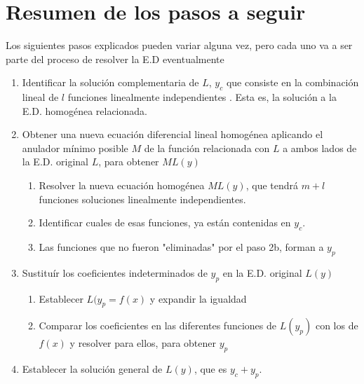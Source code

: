 \documentclass{article}
\theoremstyle{definition}
\begin{document}
\section{Resumen de los pasos a seguir}

Los siguientes pasos explicados pueden variar alguna vez, pero cada uno va a ser parte del proceso de resolver la E.D eventualmente

\begin{enumerate}
\item Identificar la soluci\'{o}n complementaria de $L$, $y_c$ que consiste en la combinaci\'{o}n lineal de $l$ funciones linealmente independientes . Esta es, la soluci\'{o}n a la E.D. homog\'{e}nea relacionada.

\item Obtener una nueva ecuaci\'{o}n diferencial lineal homog\'{e}nea aplicando el anulador m\'{i}nimo posible $M$ de la funci\'{o}n relacionada con $L$ a ambos lados de la E.D. original $L$, para obtener $ML(y)$ 
	\begin{enumerate}
		\item Resolver la nueva ecuaci\'{o}n homog\'{e}nea $ML(y)$, que tendr\'{a} $m+l$ funciones soluciones linealmente independientes.
		\item Identificar cuales de esas funciones, ya est\'{a}n contenidas en $y_c$. 
		\item Las funciones que no fueron "eliminadas" por el paso 2b, forman a $y_p$
	\end{enumerate}
	
\item Sustitu\'{i}r los coeficientes indeterminados de $y_p$ en la E.D. original $L(y)$
	\begin{enumerate}
		\item Establecer $L(y_p = f(x)$ y expandir la igualdad
		\item Comparar los coeficientes en las diferentes funciones de $L(y_p)$ con los de $f(x)$ y resolver para ellos, para obtener $y_p$ 
	\end{enumerate}
	
\item Establecer la soluci\'{o}n general de $L(y)$, que es $y_c + y_p$.
\end{enumerate} 
\end{document}
